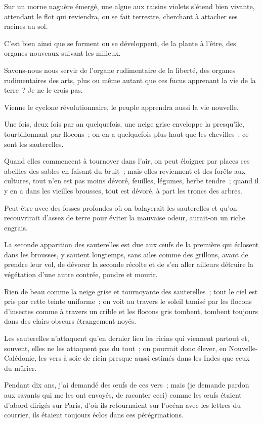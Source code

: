\documentclass[french,twoside]{book} %
\begin{document}
Sur un morne naguère émergé, une algue aux raisins violets s’étend bien vivante, attendant le  flot qui reviendra, ou se fait terrestre, cherchant à attacher ses racines au sol.\par
C’est bien ainsi que se forment ou se développent, de la plante à l’être, des organes nouveaux suivant les milieux.\par
Savons-nous nous servir de l’organe rudimentaire de la liberté, des organes rudimentaires des arts, plus ou même autant que ces fucus apprenant la vie de la terre ? Je ne le crois pas.\par
Vienne le cyclone révolutionnaire, le peuple apprendra aussi la vie nouvelle.\par
Une fois, deux fois par an quelquefois, une neige grise enveloppe la presqu’île, tourbillonnant par flocons ; on en a quelquefois plus haut que les chevilles : ce sont les sauterelles.\par
Quand elles commencent à tournoyer dans l’air, on peut éloigner par places ces abeilles des sables en faisant du bruit ; mais elles reviennent et des forêts aux cultures, tout n’en est pas moins dévoré, feuilles, légumes, herbe tendre ; quand il y en a dans les vieilles brousses, tout est dévoré, à part les troncs des arbres.\par
Peut-être avec des fosses profondes où on balayerait les sauterelles et qu’on recouvrirait d’assez de terre pour éviter la mauvaise odeur, aurait-on un riche engrais.\par
La seconde apparition des sauterelles est due  aux œufs de la première qui éclosent dans les brousses, y sautent longtemps, sans ailes comme des grillons, avant de prendre leur vol, de dévorer la seconde récolte et de s’en aller ailleurs détruire la végétation d’une autre contrée, pondre et mourir.\par
Rien de beau comme la neige grise et tournoyante des sauterelles ; tout le ciel est pris par cette teinte uniforme ; on voit au travers le soleil tamisé par les flocons d’insectes comme à travers un crible et les flocons gris tombent, tombent toujours dans des clairs-obscurs étrangement noyés.\par
Les sauterelles n’attaquent qu’en dernier lieu les ricins qui viennent partout et, souvent, elles ne les attaquent pas du tout ; on pourrait donc élever, en Nouvelle-Calédonie, les vers à soie de ricin presque aussi estimés dans les Indes que ceux du mûrier.\par
Pendant dix ans, j’ai demandé des œufs de ces vers ; mais (je demande pardon aux savants qui me les ont envoyés, de raconter ceci) comme les œufs étaient d’abord dirigés sur Paris, d’où ils retournaient sur l’océan avec les lettres du courrier, ils étaient toujours éclos dans ces pérégrinations.\par
\end{document}
